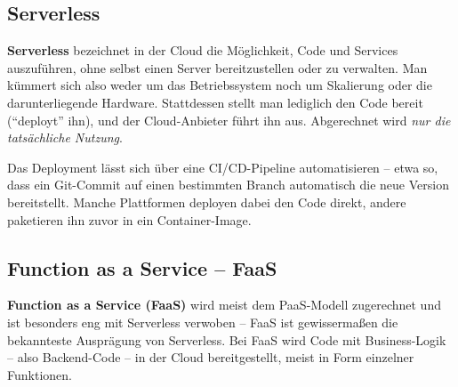 \subsection{Serverless}
\textbf{Serverless} bezeichnet in der Cloud die Möglichkeit, Code und Services
auszuführen, ohne selbst einen Server bereitzustellen oder zu verwalten. Man
kümmert sich also weder um das Betriebssystem noch um Skalierung oder die
darunterliegende Hardware. Stattdessen stellt man lediglich den Code bereit
(\enquote{deployt} ihn), und der Cloud-Anbieter führt ihn aus. Abgerechnet
wird \emph{nur die tatsächliche Nutzung}.

Das Deployment lässt sich über eine CI/CD-Pipeline automatisieren – etwa so,
dass ein Git-Commit auf einen bestimmten Branch automatisch die neue Version
bereitstellt. Manche Plattformen deployen dabei den Code direkt, andere
paketieren ihn zuvor in ein Container-Image.

\subsection{Function as a Service – FaaS}
\textbf{Function as a Service (FaaS)} wird meist dem PaaS-Modell zugerechnet und ist
besonders eng mit Serverless verwoben – FaaS ist gewissermaßen die bekannteste
Ausprägung von Serverless. Bei FaaS wird Code mit Business-Logik – also
Backend-Code – in der Cloud bereitgestellt, meist in Form einzelner Funktionen.


